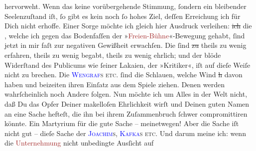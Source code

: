 \documentclass[twoside=false,titlepage=false,open=any, parskip=never, fontsize=12pt, headings=small, chapterprefix=false, appendixprefix=false]{scrbook}
\newcommand{\strikeout}[1]{\sout{#1}}
\newcommand{\pbposition}{\depth}
\newcommand{\pb}{\nobreak\hspace{0pt}\raisebox{-0.1em}{\raisebox{\pbposition}{\textnormal{|}}}\nobreak\hspace{0pt}}
\begin{document}
               hervorweht. Wenn das keine vorübergehende Stimmung, ſondern ein bleibender
               Seelenzuſtand iſt, ſo gibt es kein noch ſo hohes Ziel, deſſen Erreichung ich für Dich
               nicht erhoffe. Einer Sorge möchte ich gleich hier Ausdruck verleihen: \strikeout{ich} die \label{K_L02670-1v}\label{K_L02670-1h},
               welche {\pb}ich gegen das Bodenfaſſen der »\textcolor{brown}{Freien-Bühne}{}\ledrightnote{\textcolor{brown}{»Freie Bühne« Verein für moderne Literatur}}«-Bewegung gehabt, ſind jetzt in mir
               faſt zur negativen Gewißheit erwachſen. Die \label{K_L02670-2v}\label{K_L02670-2h} ſind \strikeout{zu} theils zu wenig erfahren, theils zu
               wenig begabt, theils zu wenig ehrlich; und der blöde Widerſtand des Publicums wie
               ſeiner Lakaien, der »Kritiker«, iſt auf dieſe Weiſe nicht zu brechen. Die \textsc{\textcolor{blue}{Wengraf}{}\ledrightnote{\textcolor{blue}{Edmund Wengraf}}s etc.} ſind die Schlauen,
               welche Wind \strikeout{h} davon haben und beizeiten ihren Einſatz
               aus dem Spiele ziehen. Denen werden wahrſcheinlich noch Andere folgen. Nun möchte ich
               um Alles in der Welt nicht, daß Du das Opfer Deiner makelloſen Ehrlichkeit wirſt und
               Deinen guten Namen an eine Sache hefteſt, die ihn bei ihrem Zuſammenbruch ſchwer
               compromittiren könnte. Ein Martyrium für die gute Sache – {\pb}meinetwegen! Aber die Sache iſt nicht gut – dieſe
               Sache der \textsc{\textcolor{blue}{Joachim}{}\ledrightnote{\textcolor{blue}{Jaques Joachim}}s}, \textsc{\textcolor{blue}{Kafka}{}\ledrightnote{\textcolor{blue}{Eduard Michael Kafka}}s }\textsc{etc.} Und darum meine ich: wenn die \textcolor{brown}{Unternehmung}{} nicht unbedingte Ausſicht auf
\end{document}
